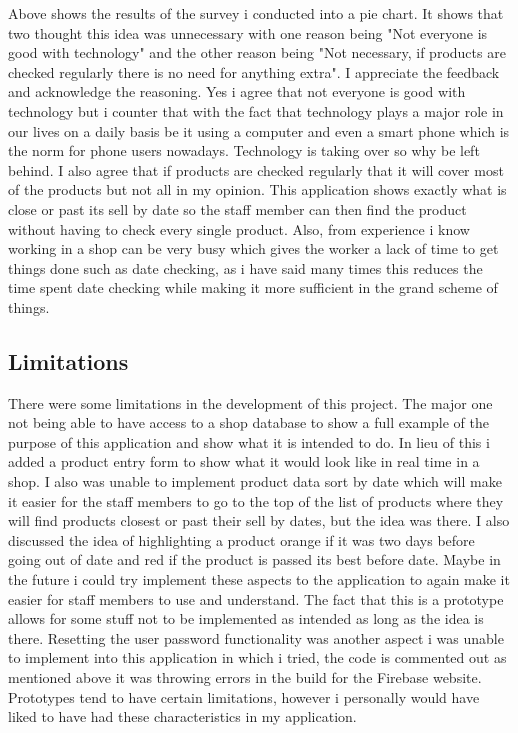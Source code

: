 Above shows the results of the survey i conducted into a pie chart. It shows that two thought this idea was unnecessary with one reason being "Not everyone is good with technology" and the other reason being "Not necessary, if products are checked regularly there is no need for anything extra". I appreciate the feedback and acknowledge the reasoning. Yes i agree that not everyone is good with technology but i counter that with the fact that technology plays a major role in our lives on a daily basis be it using a computer and even a smart phone which is the norm for phone users nowadays. Technology is taking over so why be left behind. I also agree that if products are checked regularly that it will cover most of the products but not all in my opinion. This application shows exactly what is close or past its sell by date so the staff member can then find the product without having to check every single product. Also, from experience i know working in a shop can be very busy which gives the worker a lack of time to get things done such as date checking, as i have said many times this reduces the time spent date checking while making it more sufficient in the grand scheme of things. 
\newpage
\subsection{Limitations}
There were some limitations in the development of this project. The major one not being able to have access to a shop database to show a full example of the purpose of this application and show what it is intended to do. In lieu of this i added a product entry form to show what it would look like in real time in a shop. I also was unable to implement product data sort by date which will make it easier for the staff members to go to the top of the list of products where they will find products closest or past their sell by dates, but the idea was there. I also discussed the idea of highlighting a product orange if it was two days before going out of date and red if the product is passed its best before date. Maybe in the future i could try implement these aspects to the application to again make it easier for staff members to use and understand. The fact that this is a prototype allows for some stuff not to be implemented as intended as long as the idea is there. Resetting the user password functionality was another aspect i was unable to implement into this application in which i tried, the code is commented out as mentioned above it was throwing errors in the build for the Firebase website. Prototypes tend to have certain limitations, however i personally would have liked to have had these characteristics in my application.